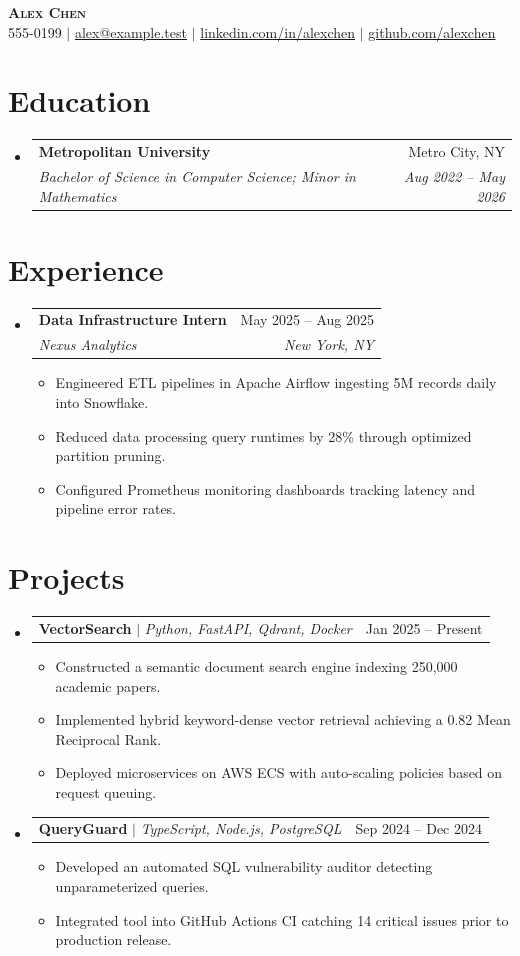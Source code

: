 \documentclass[letterpaper,11pt]{article}
\makeatletter
\newcommand{\resumeItem}[1]{\item\small{#1}}
\newcommand{\resumeSubheading}[4]{
  \vspace{-2pt}\item
    \begin{tabular*}{0.97\textwidth}[t]{l@{\extracolsep{\fill}}r}
      \textbf{#1} & #2 \\
      \textit{\small#3} & \textit{\small #4} \\
    \end{tabular*}\vspace{-7pt}
}
\newcommand{\resumeProjectHeading}[2]{
    \item
    \begin{tabular*}{0.97\textwidth}{l@{\extracolsep{\fill}}r}
      \small#1 & #2 \\
    \end{tabular*}\vspace{-7pt}
}
\newcommand{\resumeSubHeadingListStart}{\begin{itemize}[leftmargin=0.15in, label={}]}
\newcommand{\resumeSubHeadingListEnd}{\end{itemize}}
\newcommand{\resumeItemListStart}{\begin{itemize}}
\newcommand{\resumeItemListEnd}{\end{itemize}\vspace{-5pt}}
\makeatother
\begin{document}
\begin{center}
    \textbf{\Huge \scshape Alex Chen} \\ \vspace{1pt}
    \small 555-0199 $|$ \href{mailto:alex@example.test}{alex@example.test} $|$ 
    \href{https://linkedin.com/in/alexchen}{linkedin.com/in/alexchen} $|$
    \href{https://github.com/alexchen}{github.com/alexchen}
\end{center}

\section{Education}
  \resumeSubHeadingListStart
    \resumeSubheading
      {Metropolitan University}{Metro City, NY}
      {Bachelor of Science in Computer Science; Minor in Mathematics}{Aug 2022 -- May 2026}
  \resumeSubHeadingListEnd

\section{Experience}
  \resumeSubHeadingListStart
    \resumeSubheading
      {Data Infrastructure Intern}{May 2025 -- Aug 2025}
      {Nexus Analytics}{New York, NY}
      \resumeItemListStart
        \resumeItem{Engineered ETL pipelines in Apache Airflow ingesting 5M records daily into Snowflake.}
        \resumeItem{Reduced data processing query runtimes by 28\% through optimized partition pruning.}
        \resumeItem{Configured Prometheus monitoring dashboards tracking latency and pipeline error rates.}
      \resumeItemListEnd
  \resumeSubHeadingListEnd

\section{Projects}
  \resumeSubHeadingListStart
    \resumeProjectHeading
      {\textbf{VectorSearch} $|$ \emph{Python, FastAPI, Qdrant, Docker}}{Jan 2025 -- Present}
      \resumeItemListStart
        \resumeItem{Constructed a semantic document search engine indexing 250,000 academic papers.}
        \resumeItem{Implemented hybrid keyword-dense vector retrieval achieving a 0.82 Mean Reciprocal Rank.}
        \resumeItem{Deployed microservices on AWS ECS with auto-scaling policies based on request queuing.}
      \resumeItemListEnd
    \resumeProjectHeading
      {\textbf{QueryGuard} $|$ \emph{TypeScript, Node.js, PostgreSQL}}{Sep 2024 -- Dec 2024}
      \resumeItemListStart
        \resumeItem{Developed an automated SQL vulnerability auditor detecting unparameterized queries.}
        \resumeItem{Integrated tool into GitHub Actions CI catching 14 critical issues prior to production release.}
      \resumeItemListEnd
  \resumeSubHeadingListEnd
\end{document}
